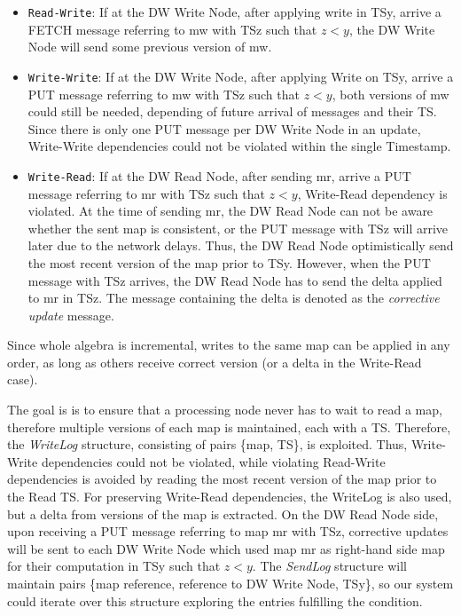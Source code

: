 \documentclass{sig-semester}
\begin{document}
\begin{itemize} 
 \item \texttt{Read-Write}:  If at the DW Write Node, after applying write in TSy, arrive a FETCH message referring to mw with TSz such that $z<y$, the DW Write Node will send some previous version of mw.

 \item \texttt{Write-Write}: If at the DW Write Node, after applying Write on TSy, arrive a PUT message referring to mw with TSz such that $z<y$, both versions of mw could still be needed, depending of future arrival of messages and their TS. Since there is only one PUT message per DW Write Node in an update, Write-Write dependencies could not be violated within the single Timestamp.
 
 \item \texttt{Write-Read}:  If at the DW Read Node, after sending mr, arrive a PUT message referring to mr with TSz such that $z<y$, Write-Read dependency is violated. At the time of sending mr, the DW Read Node can not be aware whether the sent map is consistent, or the PUT message with TSz will arrive later due to the network delays. Thus, the DW Read Node optimistically send the most recent version of the map prior to TSy. However, when the PUT message with TSz arrives, the DW Read Node has to send the delta applied to mr in TSz. The message containing the delta is denoted as the \textit{corrective update} message.

\end{itemize}

Since whole algebra is incremental, writes to the same map can be applied in any order, as long as others receive correct version (or a delta in the Write-Read case).

The goal is is to ensure that a processing node never has to wait to read a map, therefore multiple versions of each map is maintained, each with a TS. Therefore, the \textit{WriteLog} structure, consisting of pairs \{map, TS\}, is exploited. Thus, Write-Write dependencies could not be violated, while violating Read-Write dependencies is avoided by reading the most recent version of the map prior to the Read TS. For preserving Write-Read dependencies, the WriteLog is also used, but a delta from versions of the map is extracted. On the DW Read Node side, upon receiving a PUT message referring to map mr with TSz, corrective updates will be sent to each DW Write Node which used map mr as right-hand side map for their computation in TSy such that $z<y$. The \textit{SendLog} structure will maintain pairs \{map reference, reference to DW Write Node, TSy\}, so our system could iterate over this structure exploring the entries fulfilling the condition.
\end{document}
